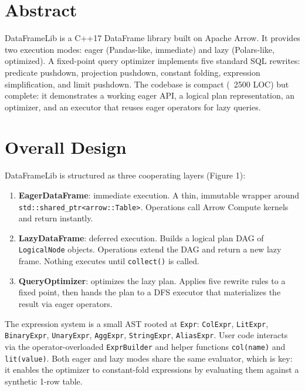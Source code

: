 \documentclass[11pt]{article}
\begin{document}
\maketitle

\section*{Abstract}
DataFrameLib is a C++17 DataFrame library built on Apache Arrow. It provides
two execution modes: eager (Pandas-like, immediate) and lazy (Polars-like, 
optimized). A fixed-point query optimizer implements five standard SQL rewrites: 
predicate pushdown, projection pushdown, constant folding, expression 
simplification, and limit pushdown. The codebase is compact (~2500 LOC) but 
complete: it demonstrates a working eager API, a logical plan representation, 
an optimizer, and an executor that reuses eager operators for lazy queries.

\section{Overall Design}

DataFrameLib is structured as three cooperating layers (Figure 1):

\begin{enumerate}
  \item \textbf{EagerDataFrame}: immediate execution. A thin, immutable wrapper 
    around \texttt{std::shared\_ptr<arrow::Table>}. Operations call Arrow Compute 
    kernels and return instantly.
  \item \textbf{LazyDataFrame}: deferred execution. Builds a logical plan DAG 
    of \texttt{LogicalNode} objects. Operations extend the DAG and return a new 
    lazy frame. Nothing executes until \texttt{collect()} is called.
  \item \textbf{QueryOptimizer}: optimizes the lazy plan. Applies five rewrite 
    rules to a fixed point, then hands the plan to a DFS executor that 
    materializes the result via eager operators.
\end{enumerate}

The expression system is a small AST rooted at \texttt{Expr}: \texttt{ColExpr}, 
\texttt{LitExpr}, \texttt{BinaryExpr}, \texttt{UnaryExpr}, \texttt{AggExpr}, 
\texttt{StringExpr}, \texttt{AliasExpr}. User code interacts via the 
operator-overloaded \texttt{ExprBuilder} and helper functions \texttt{col(name)} 
and \texttt{lit(value)}. Both eager and lazy modes share the same evaluator, 
which is key: it enables the optimizer to constant-fold expressions by 
evaluating them against a synthetic 1-row table.
\end{document}
